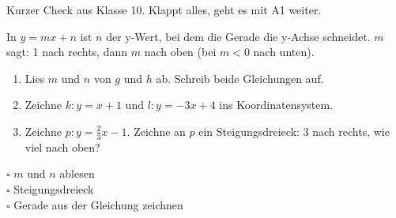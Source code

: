 \documentclass[11pt]{article}
\gdef\aktkenn{}
\newcommand{\abschnitt}[3]{\clearpage\gdef\aktkenn{#1}\label{s:#1}%
  \noindent\colorbox{black!12}{\makebox[10mm]{\Large\bfseries\strut #1}}\hspace{3mm}{\Large\bfseries #2}\par\smallskip
  \noindent #3\par\medskip}
\begin{document}
\abschnitt{V}{Vorher: Das kannst du schon}{Kurzer Check aus Klasse 10. Klappt alles, geht es mit A1 weiter.}
\noindent\begin{minipage}[t]{0.5\linewidth}\vspace{0pt}
In $y = mx + n$ ist $n$ der y-Wert, bei dem die Gerade die y-Achse schneidet. $m$ sagt: 1 nach rechts, dann $m$ nach oben (bei $m < 0$ nach unten).

\begin{enumerate}[label=\textbf{\arabic*.},leftmargin=7mm,itemsep=8pt]
\item Lies $m$ und $n$ von $g$ und $h$ ab. Schreib beide Gleichungen auf.
\item Zeichne $k\colon y = x + 1$ und $l\colon y = -3x + 4$ ins Koordinatensystem.
\item Zeichne $p\colon y = \tfrac23x - 1$. Zeichne an $p$ ein Steigungsdreieck: 3 nach rechts, wie viel nach oben?
\end{enumerate}

\medskip
\noindent$\square$ $m$ und $n$ ablesen\\
$\square$ Steigungsdreieck\\
$\square$ Gerade aus der Gleichung zeichnen
\end{minipage}\hfill
\begin{minipage}[t]{0.46\linewidth}\vspace{0pt}\centering
\begin{ksys}[xmin=-4,xmax=5,ymin=-5,ymax=6,karo=0.62]
\end{ksys}
\end{minipage}

\bigskip
{}\par\smallskip
\begin{center}
\begin{ksys}[xmin=-4,xmax=5,ymin=-5,ymax=6,karo=0.62]
\end{ksys}
\end{center}
\end{document}
